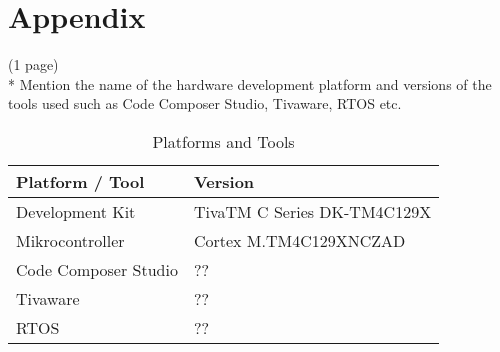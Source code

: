 \chapter{Appendix}

(1 page)\\
* Mention the name of the hardware development platform and versions of the tools used such as Code Composer Studio, Tivaware, RTOS etc.

\begin{table}[H]
	\begin{tabularx}{\textwidth}{l | X}
		Platform / Tool & Version \\
		\hline
		Development Kit & TivaTM C Series DK-TM4C129X\\
		\hline
		Mikrocontroller & Cortex M.TM4C129XNCZAD\\
		\hline
		Code Composer Studio & ??\\
		\hline
		Tivaware & ??\\
		\hline
		RTOS & ??\\
	\end{tabularx}
	\caption{Platforms and Tools}
	\label{tab:PlatformsAndTools}
\end{table}